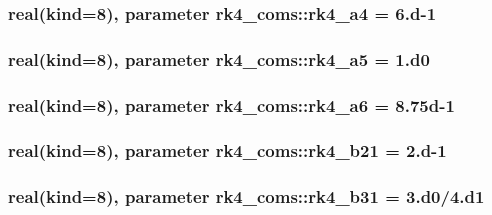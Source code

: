 \subsubsection[{rk4\+\_\+a4}]{\setlength{\rightskip}{0pt plus 5cm}real(kind=8), parameter rk4\+\_\+coms\+::rk4\+\_\+a4 = 6.d-\/1}\label{namespacerk4__coms_aaa712c298024351472a4f80d5020e7fc}
\hypertarget{namespacerk4__coms_ac364eca74fa5b87b0821f6e547e30368}{}
\subsubsection[{rk4\+\_\+a5}]{\setlength{\rightskip}{0pt plus 5cm}real(kind=8), parameter rk4\+\_\+coms\+::rk4\+\_\+a5 = 1.d0}\label{namespacerk4__coms_ac364eca74fa5b87b0821f6e547e30368}
\hypertarget{namespacerk4__coms_a572359022b68f636423b3dde68f9c34a}{}
\subsubsection[{rk4\+\_\+a6}]{\setlength{\rightskip}{0pt plus 5cm}real(kind=8), parameter rk4\+\_\+coms\+::rk4\+\_\+a6 = 8.\+75d-\/1}\label{namespacerk4__coms_a572359022b68f636423b3dde68f9c34a}
\hypertarget{namespacerk4__coms_a34abdb75b43eceb865d986e7874e03d7}{}
\subsubsection[{rk4\+\_\+b21}]{\setlength{\rightskip}{0pt plus 5cm}real(kind=8), parameter rk4\+\_\+coms\+::rk4\+\_\+b21 = 2.d-\/1}\label{namespacerk4__coms_a34abdb75b43eceb865d986e7874e03d7}
\hypertarget{namespacerk4__coms_a25fefbdc031aa0c923082df76e233542}{}
\subsubsection[{rk4\+\_\+b31}]{\setlength{\rightskip}{0pt plus 5cm}real(kind=8), parameter rk4\+\_\+coms\+::rk4\+\_\+b31 = 3.d0/4.d1}\label{namespacerk4__coms_a25fefbdc031aa0c923082df76e233542}
\hypertarget{namespacerk4__coms_aeadece49a8e779db69ab3c866d710851}{}
